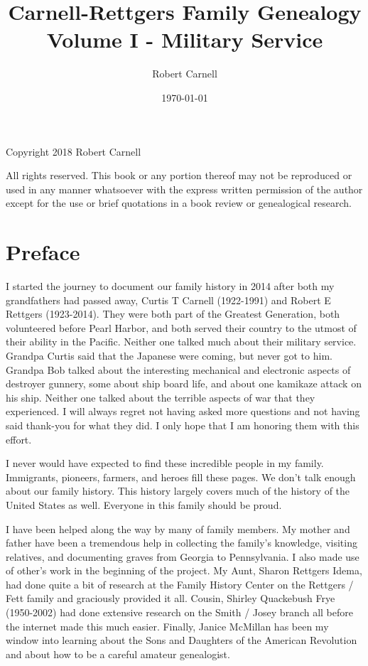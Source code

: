 \documentclass[11pt,letter]{book}
\title{\bf Carnell-Rettgers Family Genealogy \\
       \large Volume I - Military Service}
\author{Robert Carnell}
\date{\today}
\begin{document}
\frontmatter
\maketitle
\clearpage

\begingroup
\parindent 0pt
\parskip
\baselineskip
Copyright \textcopyright{} 2018 Robert Carnell

All rights reserved.  This book or any portion thereof may not be reproduced or used in any manner whatsoever with the express written permission of the author except for the use or brief quotations in a book review or genealogical research.
\endgroup
\clearpage

\chapter{Preface}

I started the journey to document our family history in 2014 after both my grandfathers had passed away, Curtis T Carnell (1922-1991) and Robert E Rettgers (1923-2014).  They were both part of the Greatest Generation, both volunteered before Pearl Harbor, and both served their country to the utmost of their ability in the Pacific.  Neither one talked much about their military service.  Grandpa Curtis said that the Japanese were coming, but never got to him.  Grandpa Bob talked about the interesting mechanical and electronic aspects of destroyer gunnery, some about ship board life, and about one kamikaze attack on his ship.  Neither one talked about the terrible aspects of war that they experienced.  I will always regret not having asked more questions and not having said thank-you for what they did.  I only hope that I am honoring them with this effort.  

I never would have expected to find these incredible people in my family.  Immigrants, pioneers, farmers, and heroes fill these pages.  We don't talk enough about our family history.  This history largely covers much of the history of the United States as well.  Everyone in this family should be proud.

I have been helped along the way by many of family members.  My mother and father have been a tremendous help in collecting the family's knowledge, visiting relatives, and documenting graves from Georgia to Pennsylvania.  I also made use of other's work in the beginning of the project.  My Aunt, Sharon Rettgers Idema, had done quite a bit of research at the Family History Center on the Rettgers / Fett family and graciously provided it all.  Cousin, Shirley Quackebush Frye (1950-2002) had done extensive research on the Smith / Josey branch all before the internet made this much easier.  Finally, Janice McMillan has been my window into learning about the Sons and Daughters of the American Revolution and about how to be a careful amateur genealogist.
\end{document}
